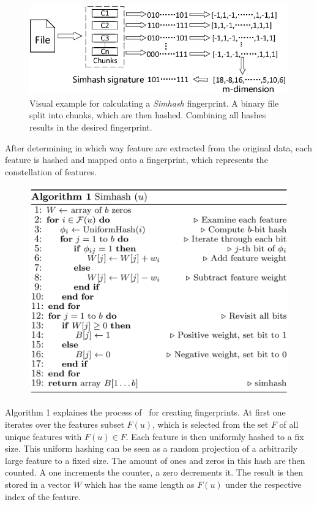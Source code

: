\documentclass[12pt,a4paper,DIV=calc]{scrartcl}
\begin{document}
\begin{figure}[H]
\includegraphics[scale=0.5]{./gfx/binary_chunk_fingerprint}
\centering
\caption{Visual example for calculating a \emph{Simhash} fingerprint.
A binary file split into chunks, which are then hashed.
Combining all hashes results in the desired fingerprint.~\cite{article:sampling-similarity}}\label{fig:gitalizer-relationship}
\end{figure}

After determining in which way feature are extracted from the original data, each feature is hashed and mapped onto a fingerprint, which represents the constellation of features.

\begin{figure}[H]
\includegraphics[scale=0.3]{./gfx/pseudocode.png}
\centering
\end{figure}

Algorithm 1 explaines the process of~\cite{inproc:evaluation} for creating fingerprints.
At first one iterates over the features subset $F(u)$, which is selected from the set $F$ of all unique features with $F(u) \in F$.
Each feature is then uniformly hashed to a fix size.
This uniform hashing can be seen as a random projection of a arbitrarily large feature to a fixed size.
The amount of ones and zeros in this hash are then counted.
A one increments the counter, a zero decrements it.
The result is then stored in a vector $W$ which has the same length as $F(u)$ under the respective index of the feature.
\end{document}
